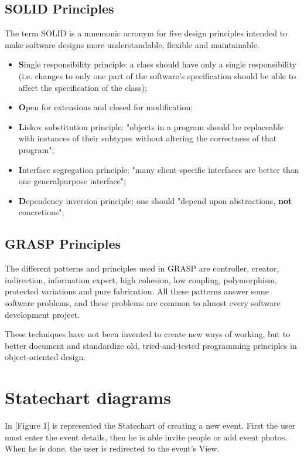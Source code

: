 \documentclass{article}
\begin{document}
		\subsection{SOLID Principles}
			The term SOLID is a mnemonic acronym for five design principles intended to make software designs more understandable, flexible and maintainable.
			\begin{itemize}
				\item \textbf{S}ingle responsibility principle: a class should have only a single responsibility (i.e. changes to only one part of the software’s specification should be able to affect the specification of the class);
				\item \textbf{O}pen for extensions and closed for modification;
				\item \textbf{L}iskov substitution principle: "objects in a program should be replaceable with instances of their subtypes without altering the correctness of that program";
				\item \textbf{I}nterface segregation principle: "many client-specific interfaces are better than one generalpurpose interface";
				\item \textbf{D}ependency inversion principle: one should "depend upon abstractions, \textbf{not} concretions";
			\end{itemize}

		\subsection{GRASP Principles}
			The different patterns and principles used in GRASP are controller, creator, indirection, information expert, high cohesion, low coupling, polymorphism, protected variations and pure fabrication. All these patterns answer some software problems, and these problems are common to almost every software development project.

			These techniques have not been invented to create new ways of working, but to better document and standardize old, tried-and-tested programming principles in object-oriented design.

	\section{Statechart diagrams}
		In [Figure 1] is represented the Statechart of creating a new event. First the user must enter the event details, then he is able invite people or add event photos. When he is done, the user is redirected to the event's View.
\end{document}
